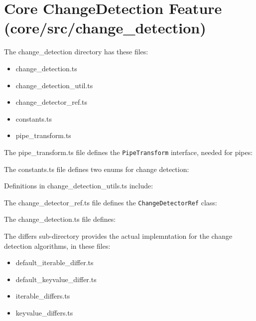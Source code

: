 \section{Core ChangeDetection Feature (core/src/change\_detection)}

The change\_detection directory has these files:

\begin{itemize}
  \item change\_detection.ts
  \item change\_detection\_util.ts
  \item change\_detector\_ref.ts
  \item constants.ts
  \item pipe\_transform.ts
\end{itemize}

The pipe\_transform.ts file defines the
\texttt{PipeTransform}
interface, needed for pipes:



The constants.ts file defines two enums for change detection:



Definitions in change\_detection\_utils.ts include:



The change\_detector\_ref.ts file defines the
\texttt{ChangeDetectorRef}
class:



The change\_detection.ts file defines:



The differs sub-directory provides the actual implemntation for the change detection
algorithms, in these files:

\begin{itemize}
  \item default\_iterable\_differ.ts
  \item default\_keyvalue\_differ.ts
  \item iterable\_differs.ts
  \item keyvalue\_differs.ts
\end{itemize}
